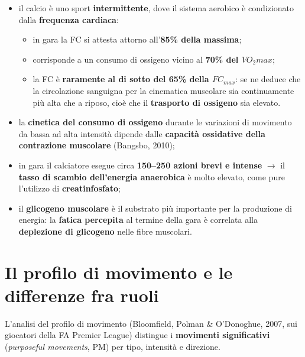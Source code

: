 \begin{itemize}
  \item il calcio è uno sport \textbf{intermittente}, dove il sistema aerobico è condizionato dalla
    \textbf{frequenza cardiaca}:
    \begin{itemize}
      \item in gara la FC si attesta attorno all'\textbf{85\% della massima};
      \item corrisponde a un consumo di ossigeno vicino al \textbf{70\% del
        $VO_2max$};
      \item la FC è \textbf{raramente al di sotto del 65\% della $FC_{max}$}: se ne deduce che la
        circolazione sanguigna per la cinematica muscolare sia continuamente più alta che a riposo,
        cioè che il \textbf{trasporto di ossigeno} sia elevato.
    \end{itemize}
  \item la \textbf{cinetica del consumo di ossigeno} durante le variazioni di movimento da bassa ad
    alta intensità dipende dalle \textbf{capacità ossidative della contrazione muscolare}
    (Bangsbo, 2010);
  \item in gara il calciatore esegue circa \textbf{150--250 azioni brevi e intense} $\rightarrow$
    il \textbf{tasso di scambio dell'energia anaerobica} è molto elevato, come pure l'utilizzo di
    \textbf{creatinfosfato};
  \item il \textbf{glicogeno muscolare} è il substrato più importante per la produzione di energia:
    la \textbf{fatica percepita} al termine della gara è correlata alla \textbf{deplezione di
    glicogeno} nelle fibre muscolari.
\end{itemize}

\section{Il profilo di movimento e le differenze fra ruoli}

L'analisi del profilo di movimento (Bloomfield, Polman \& O'Donoghue, 2007, sui giocatori della FA
Premier League) distingue i \textbf{movimenti significativi} (\textit{purposeful movements}, PM) per
tipo, intensità e direzione.

